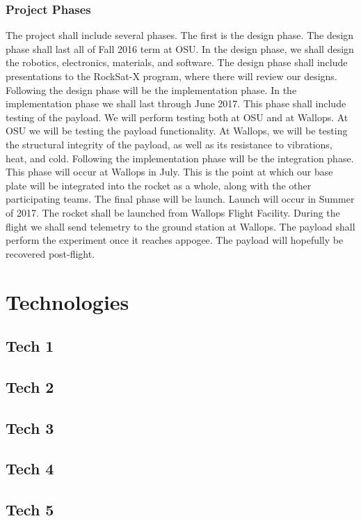 \documentclass[letterpaper,10pt]{article}
\begin{document}
\subsubsection{Project Phases}
The project shall include several phases. The first is the design phase.
The design phase shall last all of Fall 2016 term at OSU.
In the design phase, we shall design the robotics, electronics, materials, and software.
The design phase shall include presentations to the RockSat-X program, where there will review our designs.
Following the design phase will be the implementation phase.
In the implementation phase we shall last through June 2017.
This phase shall include testing of the payload.
We will perform testing both at OSU and at Wallops.
At OSU we will be testing the payload functionality.
At Wallops, we will be testing the structural integrity of the payload, as well as its resistance to vibrations, heat, and cold.
Following the implementation phase will be the integration phase.
This phase will occur at Wallops in July.
This is the point at which our base plate will be integrated into the rocket as a whole, along with the other participating teams.
The final phase will be launch. Launch will occur in Summer of 2017.
The rocket shall be launched from Wallops Flight Facility.
During the flight we shall send telemetry to the ground station at Wallops.
The payload shall perform the experiment once it reaches appogee.
The payload will hopefully be recovered post-flight.

\section{Technologies}
\subsection{Tech 1}
\subsection{Tech 2}
\subsection{Tech 3}
\subsection{Tech 4}
\subsection{Tech 5}
\end{document}
